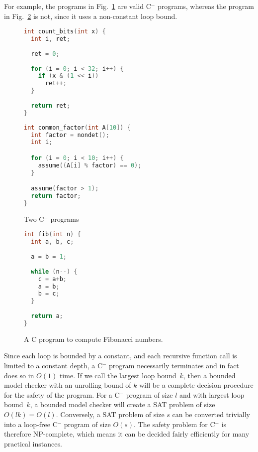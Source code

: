 \documentclass[a4paper]{llncs}
\newcommand{\newC}{C$^-$\xspace}
\begin{document}
For example, the programs in Fig.~\ref{fig:c-} are valid
\newC programs, whereas the program in Fig.~\ref{fig:not-c-} is not, since it uses
a non-constant loop bound.

\begin{figure}
\begin{minipage}[scale=0.8]{0.45\linewidth}
 \begin{lstlisting}[language=c]
int count_bits(int x) {
  int i, ret;
  
  ret = 0;
  
  for (i = 0; i < 32; i++) {
    if (x & (1 << i))
      ret++;
  }
  
  return ret;
}
 \end{lstlisting}
\end{minipage}
\begin{minipage}{0.54\linewidth}
 \begin{lstlisting}[language=C]
int common_factor(int A[10]) {
  int factor = nondet();
  int i;

  for (i = 0; i < 10; i++) {
    assume((A[i] % factor) == 0);
  }

  assume(factor > 1);
  return factor;
}

 \end{lstlisting}
\end{minipage}

 \caption{Two \newC programs}
  \label{fig:c-}

\end{figure}

\begin{figure}
 \begin{lstlisting}[language=C]
int fib(int n) {
  int a, b, c;
  
  a = b = 1;
  
  while (n--) {
    c = a+b;
    a = b;
    b = c;
  }
  
  return a;
}
 \end{lstlisting}

 \caption{A C program to compute Fibonacci numbers.}
  \label{fig:not-c-}

\end{figure}

Since each loop is bounded by a constant, and each recursive function call is
limited to a constant depth, a \newC program necessarily terminates and in
fact does so in $O(1)$ time.  If we call the largest loop bound~$k$, then
a bounded model checker with an unrolling bound of $k$ will be a complete
decision procedure for the safety of the program.  For a \newC program of
size $l$ and with largest loop bound~$k$, a bounded model checker will
create a SAT problem of size $O(lk) = O(l)$.  Conversely, a SAT problem
of size $s$ can be converted trivially into a loop-free \newC program
of size $O(s)$.  The safety problem for \newC is therefore NP-complete,
which means it can be decided fairly efficiently for many practical
instances.
\end{document}
